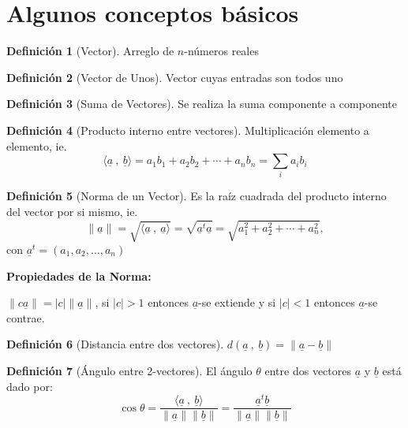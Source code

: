 \documentclass[
]{book}
\theoremstyle{definition}
\newtheorem{definition}{Definición}[chapter]
\theoremstyle{definition}
\theoremstyle{definition}
\theoremstyle{definition}
\theoremstyle{remark}
\begin{document}
\hypertarget{algunos-conceptos-buxe1sicos}{%
\section{Algunos conceptos básicos}\label{algunos-conceptos-buxe1sicos}}

\begin{definition}[Vector]
\protect\hypertarget{def:vector}{}\label{def:vector}Arreglo de \(n\)-números reales
\end{definition}

\begin{definition}[Vector de Unos]
\protect\hypertarget{def:vector-unos}{}\label{def:vector-unos}Vector cuyas entradas son todos uno
\end{definition}

\begin{definition}[Suma de Vectores]
\protect\hypertarget{def:suma-vect}{}\label{def:suma-vect}Se realiza la suma componente a componente
\end{definition}

\begin{definition}[Producto interno entre vectores]
\protect\hypertarget{def:prod-inter}{}\label{def:prod-inter}Multiplicación elemento a elemento, ie.
\[
\langle \underline{a} \ , \ \underline{b} \rangle =a_1b_1+a_2b_2+\cdots+a_n b_n= \sum_i a_i b_i
\]
\end{definition}

\begin{definition}[Norma de un Vector]
\protect\hypertarget{def:norma-vect}{}\label{def:norma-vect}Es la raíz cuadrada del producto interno del vector por si mismo, ie.
\[
\|\underline{a} \|=\sqrt{\langle \underline{a}\ , \ \underline{a} \rangle}=\sqrt{\underline{a}^t\underline{a}}=\sqrt{a_1^2+a_2^2+\cdots+a_n^2},
\]
con \(\underline{a}^t=(a_1,a_2,\ldots,a_n)\)
\end{definition}

\textbf{Propiedades de la Norma:}

\(\|c \underline{a} \|=|c|\|\underline{a}\|\), si \(|c|>1\) entonces \(\underline{a}\)-se extiende y si \(|c|<1\) entonces \(\underline{a}\)-se contrae.

\begin{definition}[Distancia entre dos vectores]
\protect\hypertarget{def:dist-vect}{}\label{def:dist-vect}\(d(\underline{a}\ , \ \underline{b})=\|\underline{a} - \underline{b} \|\)
\end{definition}

\begin{definition}[Ángulo entre 2-vectores]
\protect\hypertarget{def:angulo-vect}{}\label{def:angulo-vect}El ángulo \(\theta\) entre dos vectores \(\underline{a}\) y \(\underline{b}\) está dado por:
\[
\cos \theta=\frac{\langle  \underline{a}\ , \ \underline{b} \rangle}{\|\underline{a}\|\|\underline{b}\|}=\frac{\underline{a}^t \underline{b}}{\|\underline{a}\|\|\underline{b}\|}
\]
\end{definition}
\end{document}
